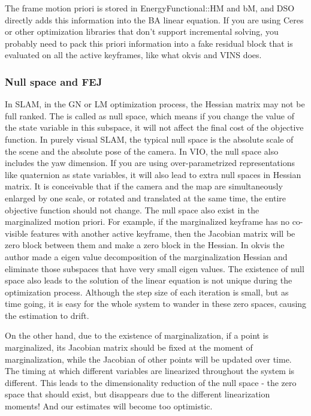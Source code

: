 \documentclass[a4paper,10pt]{article}
\begin{document}
	The frame motion priori is stored in EnergyFunctional::HM and bM, and DSO directly adds this information into the BA linear equation. If you are using Ceres or other optimization libraries that don't support incremental solving, you probably need to pack this priori information into a fake residual block that is evaluated on all the active keyframes, like what okvis \cite{leutenegger2015keyframe} and VINS \cite{qin2017vins} does.
	
	\subsubsection{Null space and FEJ}
	In SLAM, in the GN or LM optimization process, the Hessian matrix may not be full ranked. The is called as null space, which means if you change the value of the state variable in this subspace, it will not affect the final cost of the objective function. In purely visual SLAM, the typical null space is the absolute scale of the scene and the absolute pose of the camera. In VIO, the null space also includes the yaw dimension. If you are using over-parametrized representations like quaternion as state variables, it will also lead to extra null spaces in Hessian matrix. It is conceivable that if the camera and the map are simultaneously enlarged by one scale, or rotated and translated at the same time, the entire objective function should not change. The null space also exist in the marginalized motion priori. For example, if the marginalized keyframe has no co-visible features with another active keyframe, then the Jacobian matrix will be zero block between them and make a zero block in the Hessian. In okvis \cite{leutenegger2015keyframe} the author made a eigen value decomposition of the marginalization Hessian and eliminate those subspaces that have very small eigen values.  The existence of null space also leads to the solution of the linear equation is not unique during the optimization process. Although the step size of each iteration is small, but as time going, it is easy for the whole system to wander in these zero spaces, causing the estimation to drift.
	
	On the other hand, due to the existence of marginalization, if a point is marginalized, its Jacobian matrix should be fixed at the moment of marginalization, while the Jacobian of other points will be updated over time. The timing at which different variables are linearized throughout the system is different. This leads to the dimensionality reduction of the null space - the zero space that should exist, but disappears due to the different linearization moments! And our estimates will become too optimistic. %
\end{document}
